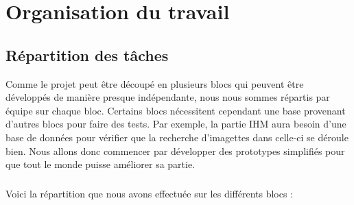 \chapter{Organisation du travail}

\section{Répartition des tâches}

Comme le projet peut être découpé en plusieurs blocs qui peuvent être
développés de manière presque indépendante, nous nous sommes répartis
par équipe sur chaque bloc. Certains blocs nécessitent
cependant une base provenant d’autres blocs pour faire des tests.
Par exemple, la partie IHM aura besoin d’une base de données pour
vérifier que la recherche d’imagettes dans celle-ci se déroule bien.
Nous allons donc commencer par développer des prototypes simplifiés
pour que tout le monde puisse améliorer sa partie.

\paragraph{}
Voici la répartition que nous avons effectuée sur les différents blocs :

